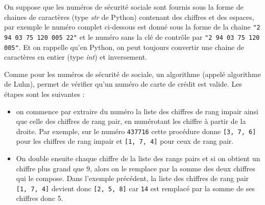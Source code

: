 \documentclass[11pt,a4paper]{article}
\begin{document}
\begin{Exercise}[title = {gestion de tests dans une entreprise},origin={\bac \; d'après {\sc ccinp 2023 - tpc, tsi}}]
On suppose que les numéros de sécurité sociale sont fournis sous la forme de chaines de caractères (type  \textit{str} de Python) contenant des chiffres et des espaces, par exemple le numéro complet ci-dessous est donné sous la forme de la chaine {\tt "2 94 03 75 120 005 22"} et le numéro sans la clé de contrôle par {\tt "2 94 03 75 120 005"}. Et on rappelle qu'en Python, on peut toujours convertir une chaine de caractères en entier  (type \textit{int}) et inversement.

\ExePart[name = Tests de numéro de carte de crédit]
Comme pour les numéros de sécurité de sociale, un algorithme (appelé algorithme de Luhn), permet de vérifier qu'un numéro de carte de crédit est valide. Les étapes sont les suivantes :
\begin{itemize}
	\item on commence par extraire du numéro la liste des chiffres de rang impair ainsi que celle des chiffres de rang pair, en numérotant les chiffre à partir de la droite. Par exemple, sur le numéro {\tt 437716} cette procédure donne {\tt [3, 7, 6]} pour les chiffres de rang impair et {\tt [1, 7, 4]} pour ceux de rang pair. 
	\item On double ensuite chaque chiffre de la liste des rangs pairs et si on obtient un chiffre plus grand que 9, alors on le remplace par la somme des deux chiffres qui le compose. Dans l'exemple précédent, la liste des chiffres de rang pair {\tt [1, 7, 4]} devient donc {\tt [2, 5, 8]} car {\tt 14} est remplacé par la somme de ses chiffres donc 5.

\end{itemize}
\end{Exercise}
\end{document}
